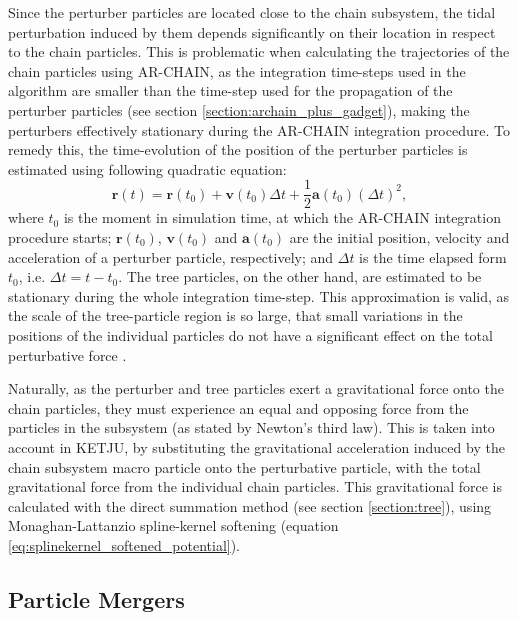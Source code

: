\documentclass[english, twoside]{HYgradu}
\begin{document}
Since the perturber particles are located close to the chain subsystem, the tidal perturbation induced by them depends significantly on their location in respect to the chain particles. This is problematic when calculating the trajectories of the chain particles using AR-CHAIN, as the integration time-steps used in the algorithm are smaller than the time-step used for the propagation of the perturber particles (see section \ref{section:archain_plus_gadget}), making the perturbers effectively stationary during the AR-CHAIN integration procedure. To remedy this, the time-evolution of the position of the perturber particles is estimated using following quadratic equation:
\begin{equation}
\mathbf{r}(t) = \mathbf{r}(t_0) + \mathbf{v}(t_0)\Delta t + \frac{1}{2}\mathbf{a}(t_0) (\Delta t)^2,
\end{equation}
where $t_0$ is the moment in simulation time, at which the AR-CHAIN integration procedure starts; $\mathbf{r}(t_0)$, $\mathbf{v}(t_0)$ and $\mathbf{a}(t_0)$ are the initial position, velocity and acceleration of a perturber particle, respectively; and $\Delta t$ is the time elapsed form $t_0$, i.e. $\Delta t = t - t_0$. The tree particles, on the other hand, are estimated to be stationary during the whole integration time-step. This approximation is valid, as the scale of the tree-particle region is so large, that small variations in the positions of the individual particles do not have a significant effect on the total perturbative force \citep{Ahmad1973}.

Naturally, as the perturber and tree particles exert a gravitational force onto the chain particles, they must experience an equal and opposing force from the particles in the subsystem (as stated by Newton's third law). This is taken into account in KETJU, by substituting the gravitational acceleration induced by the chain subsystem macro particle onto the perturbative particle, with the total gravitational force from the individual chain particles. This gravitational force is calculated with the direct summation method (see section \ref{section:tree}), using Monaghan-Lattanzio spline-kernel softening (equation \ref{eq:splinekernel_softened_potential}).

\subsection{Particle Mergers}
\end{document}
